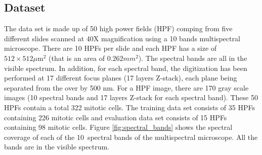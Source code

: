 \documentclass[10pt,twocolumn,letterpaper]{article}
\begin{document}
\subsection{Dataset}
The data set is made up of 50 high power fields (HPF) comping from five different slides scanned at 40X magnification using a 10 bands multispectral microscope. There are 10 HPFs per slide and each HPF has a size of $512\times512\mu\text{m}^2$ (that is an area of $0.262mm^2$). The spectral bands are all in the visible spectrum. In addition, for each spectral band, the digitization has been performed at 17 different focus planes (17 layers Z-stack), each plane being separated from the over by 500 nm. For a HPF image, there are 170 gray scale images (10 spectral bands and 17 layers Z-stack for each spectral band). These 50 HPFs contain a total 322 mitotic cells. The training data set consists of 35 HPFs containing 226 mitotic cells and evaluation data set consists of 15 HPFs containing 98 mitotic cells. Figure \ref{fig:spectral_bands} shows the spectral coverage of each of the 10~spectral bands of the multispectral microscope. All the bands are in the visible spectrum.
\end{document}
